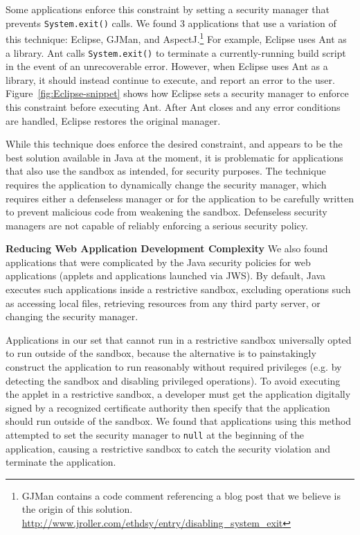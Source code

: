 \documentclass{sig-alternate}
\begin{document}
Some applications
enforce this constraint by setting a security manager
that prevents \texttt{System.exit()} calls.
We found 3 applications that use a variation of this technique:
Eclipse, GJMan, and AspectJ.\footnote{%
GJMan contains a code comment referencing a
blog post that we believe is the origin of this solution. \url{http://www.jroller.com/ethdsy/entry/disabling\_system\_exit}}
For example, Eclipse uses Ant as a library.  Ant calls \texttt{System.exit()} to
terminate a currently-running build script in the event of an unrecoverable
error.  However, when Eclipse uses Ant as a library, it
should instead continue to execute, and report an error to the user.
Figure~\ref{fig:Eclipse-snippet} shows
how Eclipse sets a security manager to enforce this constraint
before executing Ant. After Ant closes and any error conditions
are handled, Eclipse restores the original manager.

While this technique does enforce the
desired constraint, and appears to be the best solution available
in Java at the moment, it is problematic for applications that also 
use the sandbox as intended, for security purposes. The technique requires
the application to dynamically change the security manager, which requires either a defenseless manager or for the application
to be carefully written to prevent malicious code from weakening the sandbox. Defenseless security managers
are not capable of reliably enforcing a serious security policy.

\noindent\textbf{Reducing Web Application Development Complexity}%
%
We also found applications that were complicated by the Java security policies
for web applications (applets and applications launched via JWS). By default,
Java executes such applications inside a restrictive 
sandbox, 
excluding operations such as accessing local files, retrieving resources
from any third party server, or changing the security manager. 

Applications in our set that cannot run in a restrictive sandbox universally
opted to run outside of the sandbox, because the alternative is to painstakingly
construct the application to run reasonably without required privileges (e.g. by
detecting the sandbox and disabling privileged operations). To avoid executing
the applet in a restrictive 
sandbox, a developer must get the application digitally signed
by a recognized certificate authority then specify that the application should
run outside of the sandbox. We found that applications using this method attempted
to set the security manager to \texttt{null} at the beginning of the
application, causing a restrictive sandbox to catch the security violation and
terminate the application.
\end{document}
